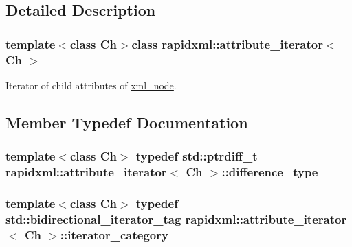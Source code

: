 \subsection{Detailed Description}
\subsubsection*{template$<$class Ch$>$class rapidxml\+::attribute\+\_\+iterator$<$ Ch $>$}

Iterator of child attributes of \hyperlink{classrapidxml_1_1xml__node}{xml\+\_\+node}. 

\subsection{Member Typedef Documentation}
\hypertarget{classrapidxml_1_1attribute__iterator_accfd6d8527d32b427496b42f71a2e37a}{}
\subsubsection[{difference\+\_\+type}]{\setlength{\rightskip}{0pt plus 5cm}template$<$class Ch$>$ typedef std\+::ptrdiff\+\_\+t {\bf rapidxml\+::attribute\+\_\+iterator}$<$ Ch $>$\+::{\bf difference\+\_\+type}}\label{classrapidxml_1_1attribute__iterator_accfd6d8527d32b427496b42f71a2e37a}
\hypertarget{classrapidxml_1_1attribute__iterator_a97ac5d8b98f5b03c68cc566f5ac0a9e0}{}
\subsubsection[{iterator\+\_\+category}]{\setlength{\rightskip}{0pt plus 5cm}template$<$class Ch$>$ typedef std\+::bidirectional\+\_\+iterator\+\_\+tag {\bf rapidxml\+::attribute\+\_\+iterator}$<$ Ch $>$\+::{\bf iterator\+\_\+category}}\label{classrapidxml_1_1attribute__iterator_a97ac5d8b98f5b03c68cc566f5ac0a9e0}
\hypertarget{classrapidxml_1_1attribute__iterator_a69acc2e60270d6a062c03c9cb1cf2aa7}{}
